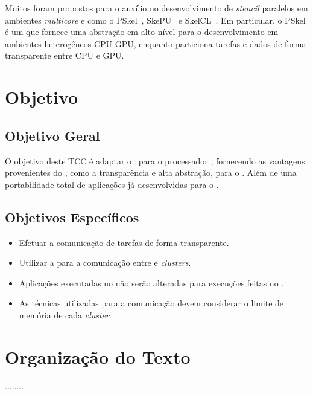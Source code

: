 Muitos \fws foram propostos para o auxílio no desenvolvimento de
\textit{stencil} paralelos em ambientes \textit{multicore} e \gpu como o
PSkel~\cite{pereira15}, SkePU~\cite{enmyren10} e SkelCL~\cite{steuwer11}. Em
particular, o PSkel é um \fw que fornece uma abstração em alto nível para o
desenvolvimento em ambientes heterogêneos CPU-GPU, enquanto particiona tarefas e
dados de forma transparente entre CPU e GPU.

\section{Objetivo}
\subsection{Objetivo Geral}
O objetivo deste TCC é adaptar o \fw ~\pskel para o processador \mppa,
fornecendo as vantagens provenientes do \fw, como a transparência e alta
abstração, para o \mppa. Além de uma portabilidade total de aplicações já
desenvolvidas para o \fw.

\subsection{Objetivos Específicos}
\begin{itemize}
	\item Efetuar a comunicação de tarefas de forma transparente.
    \item Utilizar a \noc para a comunicação entre \io e \textit{clusters}.
    \item Aplicações executadas no \fw não serão alteradas para execuções feitas
        no \mppa.
    \item As técnicas utilizadas para a comunicação devem considerar o limite de
        memória de cada \textit{cluster}.
\end{itemize}

\section{Organização do Texto}
........



